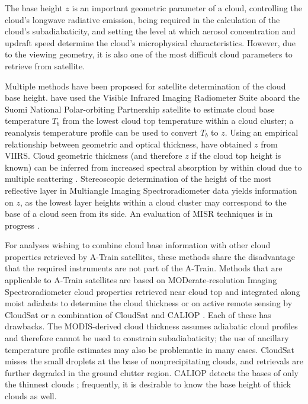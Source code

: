 \documentclass[essd,manuscript]{copernicus}\usepackage[]{graphicx}\usepackage[]{color}
\newcommand\CBH{\ensuremath{z}}
\begin{document}
\introduction  %
\label{sec:intro}
The base height \CBH{} is an important geometric parameter of a cloud,
controlling the cloud's longwave radiative emission, being required in the
calculation of the cloud's subadiabaticity, and setting the level at which
aerosol concentration and updraft speed determine the cloud's microphysical
characteristics.  However, due to the viewing geometry, it is also one of the
most difficult cloud parameters to retrieve from satellite.

Multiple methods have been proposed for satellite determination of the cloud
base height.  \cite{Zhu2014} have used the Visible Infrared Imaging Radiometer Suite
aboard the Suomi National Polar-orbiting Partnership satellite
\citep[VIIRS,][]{Cao2014} to estimate cloud base temperature $T_b$ from the
lowest cloud top temperature within a cloud cluster; a reanalysis temperature
profile can be used to convert $T_b$ to \CBH{}.  Using an empirical relationship
between geometric and optical thickness, \cite{Fitch2016} have obtained \CBH{} from
VIIRS.  Cloud geometric thickness (and therefore \CBH{} if the cloud top height is
known) can be inferred from increased spectral absorption by  within cloud
due to multiple scattering \citep{Kokhanovsky2005,Lelli2018}.  Stereoscopic determination of
the height of the most reflective layer \citep{Naud2005,Naud2007} in Multiangle
Imaging Spectroradiometer data \citep[MISR,][]{Diner1998} yields information on
\CBH{}, as the lowest layer heights within a cloud cluster may correspond to the
base of a cloud seen from its side.  An evaluation of MISR
  techniques is in progress \citep{Boehm2017}.

For analyses wishing to combine cloud base information with other cloud
properties retrieved by A-Train satellites, these methods share the disadvantage
that the required instruments are not part of the A-Train.  Methods that are
applicable to A-Train satellites are based on MODerate-resolution Imaging
Spectroradiometer \citep[MODIS,][]{Platnick2017} cloud properties retrieved near
cloud top and integrated along moist adiabats to determine the cloud thickness
\citep{Meerkoetter2007} or on active remote sensing by CloudSat
\citep[2B-GEOPROF,][]{Marchand2008} or a combination of CloudSat and CALIOP
\citep[2B-GEOPROF-LIDAR,][]{Mace2014}.  Each of these has drawbacks.  The
MODIS-derived cloud thickness assumes adiabatic cloud profiles and therefore
cannot be used to constrain subadiabaticity; the use of ancillary temperature
profile estimates may also be problematic in many cases.  CloudSat misses the
small droplets at the base of nonprecipitating clouds, and retrievals are
further degraded in the ground clutter region.  CALIOP detects the bases of only
the thinnest clouds \citep[$\tau < 5$,][]{Mace2014}; frequently, it is desirable
to know the base height of thick clouds as well.
\end{document}
